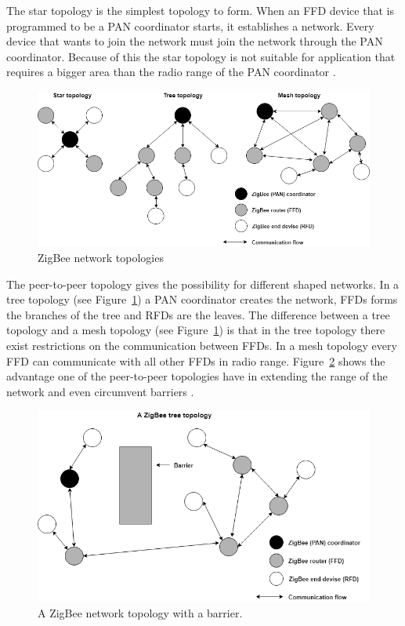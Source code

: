 The star topology is the simplest topology to form. When an FFD device that is programmed to be a PAN coordinator starts, it establishes a network. Every device that wants to join the network must join the network through the PAN coordinator. Because of this the star topology is not suitable for application that requires a bigger area than the radio range of the PAN coordinator \citep{yang2014internet}.

\begin{figure}[H]
\centering
\includegraphics[scale=0.5]{figure/zigbeetopologies.png}
\caption{ZigBee network topologies}
\label{fig:zigbeetopologies}
\end{figure}

The peer-to-peer topology gives the possibility for different shaped networks. In a tree topology (see Figure~\ref{fig:zigbeetopologies}) a PAN coordinator creates the network, FFDs forms the branches of the tree and RFDs are the leaves. The difference between a tree topology and a mesh topology (see Figure~\ref{fig:zigbeetopologies}) is that in the tree topology there exist restrictions on the communication between FFDs. In a mesh topology every FFD can communicate with all other FFDs in radio range. Figure~\ref{fig:barrier_topology} shows the advantage one of the peer-to-peer topologies have in extending the range of the network and even circumvent barriers \citep{farahani2011zigbee}.

\begin{figure}[ht]
\centering
\includegraphics[scale=0.5]{figure/barrier_topology.png}
\caption{A ZigBee network topology with a barrier.}
\label{fig:barrier_topology}
\end{figure}

